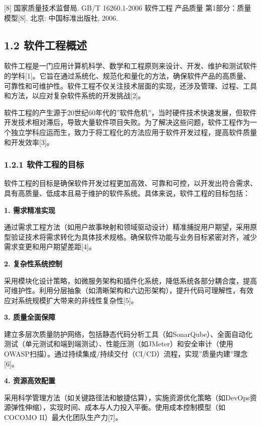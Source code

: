 {[}8{]} 国家质量技术监督局. GB/T 16260.1-2006 软件工程 产品质量 第1部分：质量模型{[}S{]}. 北京: 中国标准出版社, 2006.

\subsection{1.2 软件工程概述}\label{ux8f6fux4ef6ux5de5ux7a0bux6982ux8ff0}

软件工程是一门应用计算机科学、数学和工程原则来设计、开发、维护和测试软件的学科{[}1{]}。它旨在通过系统化、规范化和量化的方法，确保软件产品的高质量、可靠性和可维护性。软件工程不仅关注技术层面的实现，还涉及管理、过程、工具和方法，以应对复杂软件系统的开发挑战{[}2{]}。

软件工程的产生源于20世纪60年代的''软件危机''，当时硬件技术快速发展，但软件开发技术相对滞后，导致大量软件项目失败。为了解决这些问题，软件工程作为一个独立学科应运而生，致力于将工程化的方法应用于软件开发过程，提高软件质量和开发效率{[}3{]}。

\subsubsection{1.2.1 软件工程的目标}\label{ux8f6fux4ef6ux5de5ux7a0bux7684ux76eeux6807}

软件工程的目标是确保软件开发过程更加高效、可靠和可控，以开发出符合需求、具有高质量、低成本且易于维护的软件系统。具体来说，软件工程的目标包括：

\textbf{1. 需求精准实现}

通过需求工程方法（如用户故事映射和领域驱动设计）精准捕捉用户期望，采用原型验证技术将需求转化为具体技术规格。确保软件功能与业务目标紧密对齐，减少需求变更和用户期望差距{[}4{]}。

\textbf{2. 复杂性系统控制}

采用模块化设计策略，如微服务架构和插件化系统，降低系统各部分耦合度，提高可维护性。利用分层抽象（如清晰架构和六边形架构），提升代码可理解性，有效应对系统规模扩大带来的非线性复杂性{[}5{]}。

\textbf{3. 质量全面保障}

建立多层次质量防护网络，包括静态代码分析工具（如SonarQube）、全面自动化测试（单元测试和端到端测试）、性能压测（如JMeter）和安全审计（使用OWASP扫描）。通过持续集成/持续交付（CI/CD）流程，实现''质量内建''理念{[}6{]}。

\textbf{4. 资源高效配置}

采用科学管理方法（如关键路径法和敏捷估算），实施资源优化策略（如DevOps资源弹性伸缩），实现时间、成本与人力投入平衡。使用成本控制模型（如COCOMO II）最大化团队生产力{[}7{]}。


